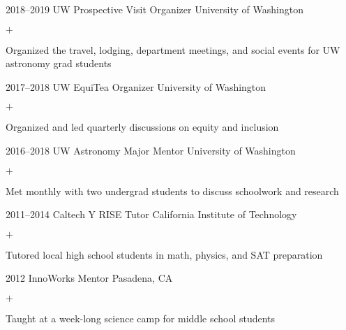\documentclass[]{luger-cv} %
\begin{document}
\begin{entrylist}
\entry
{2018--2019}
{UW Prospective Visit Organizer}
{University of Washington}
{%
\vspace{-1em}
\begin{list}{$+$}{\cvlist}
\item Organized the travel, lodging, department meetings, and social events for UW astronomy grad students
\end{list}
}

\entry
{2017--2018}
{UW EquiTea Organizer}
{University of Washington}
{%
\vspace{-1em}
\begin{list}{$+$}{\cvlist}
\item Organized and led quarterly discussions on equity and inclusion
\end{list}
}


\entry
{2016--2018}
{UW Astronomy Major Mentor}
{University of Washington}
{%
\vspace{-1em}
\begin{list}{$+$}{\cvlist}
\item Met monthly with two undergrad students to discuss schoolwork and research
\end{list}
}


\ifdefined \onepage \else
\end{entrylist}
%
%
\begin{entrylist}
\fi


\entry
{2011--2014}
{Caltech Y RISE Tutor}
{California Institute of Technology}
{%
\vspace{-1em}
\begin{list}{$+$}{\cvlist}
\item Tutored local high school students in math, physics, and SAT preparation
\fi
\end{list}
}

%

\ifdefined \onepage \else
\entry
{2012}
{InnoWorks Mentor}
{Pasadena, CA}
{%
\vspace{-1em}
\begin{list}{$+$}{\cvlist}
\item Taught at a week-long science camp for middle school students
\end{list}
}
\fi


\end{entrylist}
\end{document}
